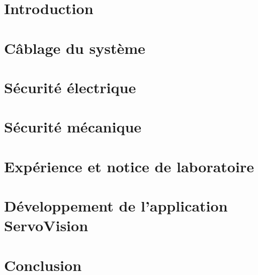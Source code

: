 \documentclass[
    iai, %
    eai, %
    confidential, %
]{heig-tb}
\begin{document}
\maketitle
\frontmatter
\clearemptydoublepage

\preamble
\authentification

\begin{abstract}
    
\end{abstract}
\clearemptydoublepage
{
    \tableofcontents
    \let\cleardoublepage\clearpage
}
\printnomenclature
\clearemptydoublepage
{}

\mainmatter
\chapter{Introduction}

% 
\chapter{Câblage du système}


\chapter{Sécurité électrique} \label{chapter:securite_electrique}

\chapter{Sécurité mécanique} \label{chapter:securite_mecanique}

\chapter{Expérience et notice de laboratoire} \label{chapter:notice_labo}

\chapter{Développement de l'application ServoVision} \label{chapter:app_servovision}


\chapter{Conclusion}

\end{document}
